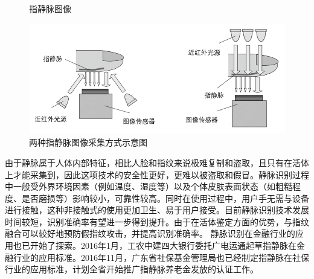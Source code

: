 \begin{figure}[ht]
\centering  %
\caption{指静脉图像\cite{hashimoto2006finger}}
\label{fig:finger_vein}
\end{figure}

\begin{figure}[ht]
\centering
\includegraphics[scale=0.6]{img/chapter_br/finger_vein_equip.png}
\caption{两种指静脉图像采集方式示意图\cite{hashimoto2006finger}}
\label{fig:finger_vein_equip}
\end{figure}

由于静脉属于人体内部特征，相比人脸和指纹来说极难复制和盗取，且只有在活体上才能采集到，因此这项技术的安全性更好，更难以被盗取和假冒。静脉识别过程中一般受外界环境因素（例如温度、湿度等）以及个体皮肤表面状态（如粗糙程度、是否磨损等）影响较小，可靠性较高。同时在使用过程中，用户手无需与设备进行接触，这种非接触式的使用更加卫生、易于用户接受。目前静脉识别技术发展时间较短，识别准确率有望进一步得到提升。由于在活体鉴定方面的优势，与指纹融合可以较好地预防假指纹攻击，并提高识别准确率。
静脉识别在金融行业的应用也已开始了探索。2016年1月，工农中建四大银行委托广电运通起草指静脉在金融行业的应用标准。2016年11月，广东省社保基金管理局也已经制定指静脉在社保行业的应用标准，计划全省开始推广指静脉养老金发放的认证工作。

